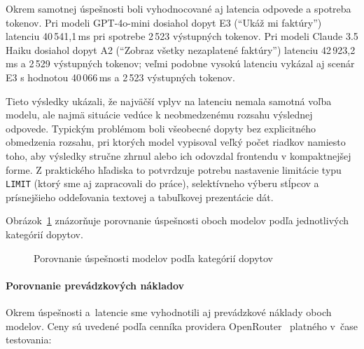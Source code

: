 Okrem samotnej úspešnosti boli vyhodnocované aj latencia odpovede a spotreba tokenov.
Pri modeli GPT-4o-mini dosiahol dopyt E3 (\enquote{Ukáž mi faktúry}) latenciu 40\,541{,}1\,ms
pri spotrebe 2\,523 výstupných tokenov. Pri modeli Claude 3.5 Haiku dosiahol
dopyt A2 (\enquote{Zobraz všetky nezaplatené faktúry}) latenciu 42\,923{,}2\,ms a
2\,529 výstupných tokenov; veľmi podobne vysokú latenciu vykázal aj scenár E3 s
hodnotou 40\,066\,ms a 2\,523 výstupných tokenov.

Tieto výsledky ukázali, že najväčší vplyv na latenciu nemala samotná voľba modelu,
ale najmä situácie vedúce k neobmedzenému rozsahu výslednej odpovede. Typickým problémom
boli všeobecné dopyty bez explicitného obmedzenia rozsahu, pri ktorých model
vypisoval veľký počet riadkov namiesto toho, aby výsledky stručne zhrnul alebo ich
odovzdal frontendu v kompaktnejšej forme. Z praktického hľadiska to potvrdzuje
potrebu nastavenie limitácie typu \texttt{LIMIT} (ktorý sme aj zapracovali do
práce), selektívneho výberu stĺpcov a prísnejšieho oddeľovania textovej a
tabuľkovej prezentácie dát.

Obrázok~\ref{fig:benchmark_graf_models} znázorňuje porovnanie úspešnosti oboch
modelov podľa jednotlivých kategórií dopytov.

\begin{figure}[H]
	\centering
	\caption{Porovnanie úspešnosti modelov podľa kategórií dopytov}
	\label{fig:benchmark_graf_models}
\end{figure}

\paragraph{Porovnanie prevádzkových nákladov}

Okrem úspešnosti a~latencie sme vyhodnotili aj prevádzkové náklady oboch modelov.
Ceny sú uvedené podľa cenníka providera OpenRouter~\cite{openrouter2024}
platného v~čase testovania:

